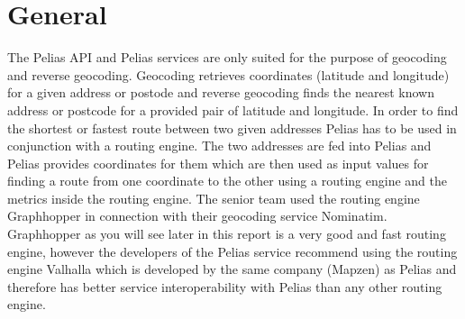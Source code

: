 
\section{General}
The Pelias API and Pelias services are only suited for the purpose of geocoding and reverse geocoding. Geocoding retrieves coordinates (latitude and longitude) for a given address or postode and reverse geocoding finds the nearest known address or postcode for a provided pair of latitude and longitude.
In order to find the shortest or fastest route between two given addresses Pelias has to be used in conjunction with a routing engine. The two addresses are fed into Pelias and Pelias provides coordinates for them which are then used as input values for finding a route from one coordinate to the other using a routing engine and the metrics inside the routing engine.
The senior team used the routing engine Graphhopper in connection with their geocoding service Nominatim. Graphhopper as you will see later in this report is a very good and fast routing engine, however the developers of the Pelias service recommend using the routing engine Valhalla which is developed by the same company (Mapzen) as Pelias and therefore has better service interoperability with Pelias than any other routing engine.
